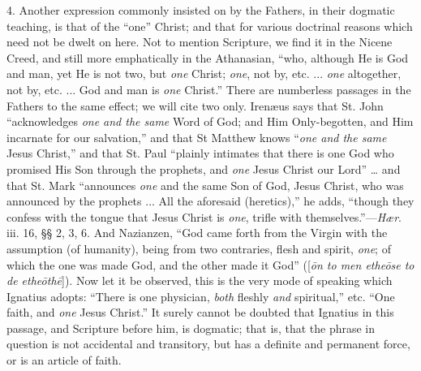 4. Another expression commonly insisted on by the
Fathers, in their dogmatic teaching, is that of the ``one'' Christ; and
that for various doctrinal reasons which need not be dwelt on here.
Not to mention Scripture, we find it in the Nicene Creed, and still
more emphatically in the Athanasian, ``who, although He is God and man,
yet He is not two, but \emph{one} Christ; \emph{one}, not by, etc. ...
\emph{one} altogether, not by, etc. ... God and man is \emph{one}
Christ.'' There are numberless passages in the Fathers to the same
effect; we will cite two only. Irenæus says that St. John ``acknowledges
\emph{one and the same} Word of God; and Him Only-begotten, and Him
incarnate for our salvation,'' and that St Matthew knows ``\emph{one and
the same} Jesus Christ,'' and that St. Paul ``plainly intimates that
there is one God who promised His Son through the prophets, and \emph{one}
Jesus Christ our Lord'' … and that St. Mark ``announces \emph{one} and
the same Son of God, Jesus Christ, who was announced by the prophets
... All the aforesaid (heretics),'' he adds, ``though they confess with
the tongue that Jesus Christ is \emph{one}, trifle with themselves.''—\emph{Hær}.
iii. 16, §§ 2, 3, 6. And Nazianzen, ``God came forth from the Virgin
with the assumption (of humanity), being from two contraries, flesh
and spirit, \emph{one}; of which the one was made God, and the other
made it God'' ([\emph{\={o}n to men ethe\={o}se to de ethe\={o}th\={e}}]).
Now let it be observed, this is the very mode of speaking which
Ignatius adopts: ``There is one physician, \emph{both} fleshly \emph{and}
spiritual,'' etc. ``One faith, and \emph{one} Jesus Christ.'' It surely
cannot be doubted that Ignatius in this passage, and Scripture before
him, is dogmatic; that is, that the phrase in question is not
accidental and transitory, but has a definite and permanent force, or
is an article of faith.

